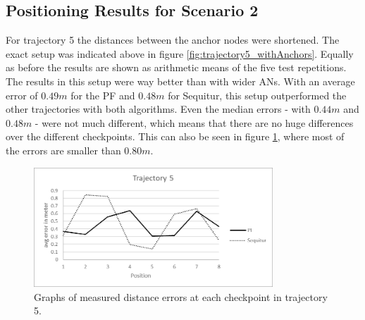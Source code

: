 \subsection{Positioning Results for Scenario 2}
For trajectory 5 the distances between the anchor nodes were shortened. The exact setup was indicated above in figure \ref{fig:trajectory5_withAnchors}. Equally as before the results are shown as arithmetic means of the five test repetitions.\\
\noindent\hspace*{5mm}%
The results in this setup were way better than with wider ANs. With an average error of $0.49m$ for the PF and $0.48m$ for Sequitur, this setup outperformed the other trajectories with both algorithms. Even the median errors - with $0.44m$ and $0.48m$ -  were not much different, which means that there are no huge differences over the different checkpoints. This can also be seen in figure \ref{fig:trajectory5_results}, where most of the errors are smaller than $0.80m$.

\begin{figure}[th]
\centering
\includegraphics[width=0.8\textwidth]{Figures/trajectory5_results}
\decoRule
\caption[Positioning Results Trajectory 5]{Graphs of measured distance errors at each checkpoint in trajectory 5.}
\label{fig:trajectory5_results}
\end{figure}

